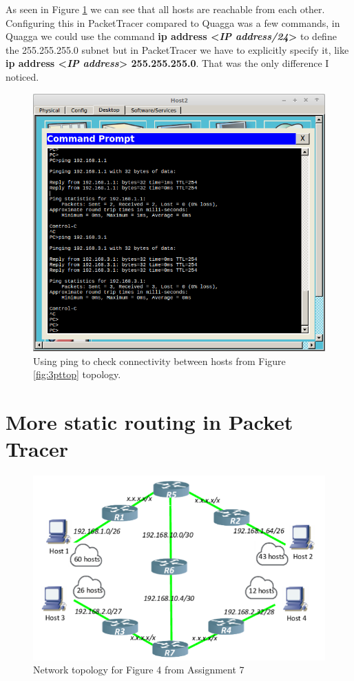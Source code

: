 \documentclass{article}
\begin{document}
As seen in Figure \ref{fig:3ping} we can see that all hosts are reachable from each other. Configuring this in PacketTracer compared to Quagga was a few commands, in Quagga we could use the command \textbf{ip address {\textless}\textit{IP address/24}{\textgreater}} to define the 255.255.255.0 subnet but in PacketTracer we have to explicitly specify it, like \textbf{ip address {\textless}\textit{IP address}{\textgreater} 255.255.255.0}. That was the only difference I noticed.

\begin{figure}[h]
    \centering
    \includegraphics[scale=0.4]{3ping}
    \caption{Using ping to check connectivity between hosts from Figure \ref{fig:3pttop} topology.}
    \label{fig:3ping}
\end{figure}



\section{More static routing in Packet Tracer}

\begin{figure}[h]
    \centering
    \includegraphics[scale=0.3]{4topassign}
    \caption{Network topology for Figure 4 from Assignment 7}
    \label{fig:4topassign}
\end{figure}
\end{document}
